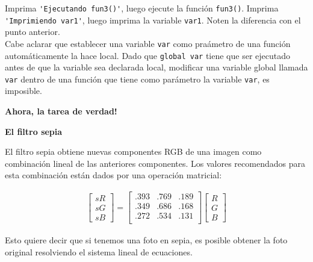 \documentclass[11pt,letterpaper]{exam}
\begin{document}
\begin{questions}
Imprima \verb"'Ejecutando fun3()'", luego ejecute la funci\'on \verb"fun3()". Imprima \verb"'Imprimiendo var1'", luego imprima la variable \verb"var1". Noten la diferencia con el punto anterior.\\

Cabe aclarar que establecer una variable \verb"var" como pra\'ametro de una funci\'on autom\'aticamente la hace local. Dado que \verb"global var" tiene que ser ejecutado antes de que la variable sea declarada local, modificar una variable global llamada \verb"var" dentro de una funci\'on que tiene como par\'ametro la variable \verb"var", es imposible.\\
\end{questions}

\LARGE \textbf{Ahora, la tarea de verdad!}\\

\normalsize

\textbf{El filtro sepia}

El filtro sepia obtiene nuevas componentes RGB de una imagen como combinaci\'on lineal de las anteriores componentes. Los valores recomendados para esta combinaci\'on est\'an dados por una operaci\'on matricial:

\begin{gather}
 \begin{bmatrix} sR \\ sG \\ sB \end{bmatrix}
 =
  \begin{bmatrix}
   .393 & .769 & .189\\
   .349 & .686 & .168\\
   .272 & .534 & .131\\
   \end{bmatrix}
   \begin{bmatrix} R \\ G \\ B \end{bmatrix}
\end{gather}

Esto quiere decir que si tenemos una foto en sepia, es posible obtener la foto original resolviendo el sistema lineal de ecuaciones.
\end{document}
